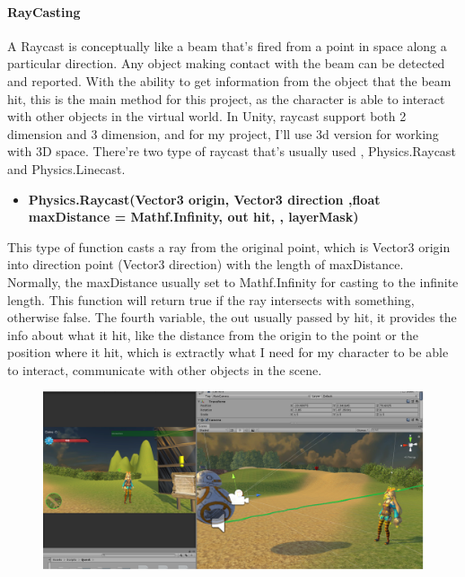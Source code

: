 \documentclass[a4paper, 13pt]{extarticle}
\begin{document}
\paragraph{RayCasting}
  A Raycast is conceptually like a beam that's fired from a point in space along a particular direction. Any object making contact with the beam can be detected and reported. With the ability to get information from the object that the beam hit, this is the main method for this project, as the character is able to interact with other objects in the virtual world. In Unity, raycast support both 2 dimension and 3 dimension, and for my project, I'll use 3d version for working with 3D space. There're two type of raycast that's usually used , Physics.Raycast and Physics.Linecast.
  \begin{itemize}
  	\item \bfseries Physics.Raycast(Vector3 origin,  Vector3 direction ,float maxDistance = Mathf.Infinity, out hit, , layerMask)	 	
  \end{itemize}
 	This type of function casts a ray from the original point, which is Vector3 origin into direction point (Vector3 direction) with the length of maxDistance. Normally, the maxDistance usually set to Mathf.Infinity for casting to the infinite length. This function will return true if the ray intersects with something, otherwise false. The fourth variable, the out usually passed by hit, it provides the info about what it hit, like the distance from the origin to the point or the position where it hit, which is extractly what I need for my character to be able to interact, communicate with other objects in the scene.
 	\begin{figure}[h]
 		
 		\begin{minipage}{1\textwidth}
 			\centering
 			\includegraphics[width=1\linewidth]{intructions/RayCast_example1.png}
 			\centering
 			\label{fig:test14}
 		\end{minipage}
 	
 	\end{figure} 
 	
\end{document}
